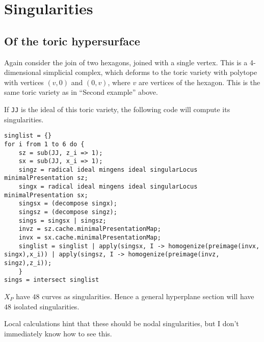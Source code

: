 \documentclass[11pt, english]{article}
\begin{document}
\section{Singularities}

\subsection{Of the toric hypersurface}

Again consider the join of two hexagons, joined with a single vertex. This is a 4-dimensional simplicial complex, which deforms to the toric variety with polytope with vertices $(v,0)$ and $(0,v)$, where $v$ are vertices of the hexagon. This is the same toric variety as in ``Second example'' above.

If \texttt{JJ} is the ideal of this toric variety, the following code will compute its singularities. 

\begin{lstlisting}
singlist = {}
for i from 1 to 6 do {
    sz = sub(JJ, z_i => 1);
    sx = sub(JJ, x_i => 1);
    singz = radical ideal mingens ideal singularLocus  minimalPresentation sz;
    singx = radical ideal mingens ideal singularLocus  minimalPresentation sx;
    singsx = (decompose singx);
    singsz = (decompose singz);
    sings = singsx | singsz;
    invz = sz.cache.minimalPresentationMap;
    invx = sx.cache.minimalPresentationMap;
    singlist = singlist | apply(singsx, I -> homogenize(preimage(invx, singx),x_i)) | apply(singsz, I -> homogenize(preimage(invz, singz),z_i));
    }
sings = intersect singlist
\end{lstlisting}

$X_P$ have $48$ curves as singularities. Hence a general hyperplane section will have $48$ isolated singularities.

\begin{remark}
Local calculations hint that these should be nodal singularities, but I don't immediately know how to see this.
\end{remark}
\end{document}
